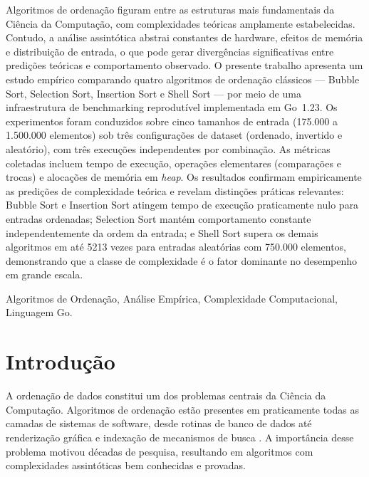 \documentclass[12pt]{article}
\newcommand{\num}[1]{#1}
\begin{document}
\begin{resumo}
Algoritmos de ordenação figuram entre as estruturas mais
fundamentais da Ciência da Computação, com complexidades teóricas
amplamente estabelecidas. Contudo, a análise assintótica abstrai
constantes de hardware, efeitos de memória e distribuição de
entrada, o que pode gerar divergências significativas entre
predições teóricas e comportamento observado. O presente trabalho
apresenta um estudo empírico comparando quatro algoritmos de
ordenação clássicos — Bubble Sort, Selection Sort, Insertion Sort
e Shell Sort — por meio de uma infraestrutura de benchmarking
reprodutível implementada em Go~1.23. Os experimentos foram
conduzidos sobre cinco tamanhos de entrada (175.000 a 1.500.000
elementos) sob três configurações de dataset (ordenado, invertido
e aleatório), com três execuções independentes por combinação.
As métricas coletadas incluem tempo de execução, operações
elementares (comparações e trocas) e alocações de memória em
\textit{heap}. Os resultados confirmam empiricamente as predições
de complexidade teórica e revelam distinções práticas relevantes:
Bubble Sort e Insertion Sort atingem tempo de execução
praticamente nulo para entradas ordenadas; Selection Sort mantém
comportamento constante independentemente da ordem da entrada; e
Shell Sort supera os demais algoritmos em até \num{5213} vezes
para entradas aleatórias com 750.000 elementos, demonstrando que
a classe de complexidade é o fator dominante no desempenho
em grande escala.

 Algoritmos de Ordenação, Análise Empírica, Complexidade Computacional, Linguagem Go.
\end{resumo}

\section{Introdução}

A ordenação de dados constitui um dos problemas centrais da
Ciência da Computação. Algoritmos de ordenação estão presentes
em praticamente todas as camadas de sistemas de software, desde
rotinas de banco de dados até renderização gráfica e indexação
de mecanismos de busca \cite{cormen2009}. A importância desse
problema motivou décadas de pesquisa, resultando em algoritmos
com complexidades assintóticas bem conhecidas e provadas.
\end{document}
